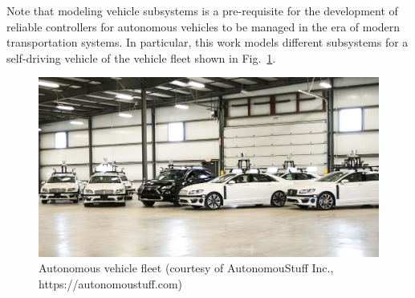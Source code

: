 \documentclass[conference]{IEEEtran}
\begin{document}
Note that modeling vehicle subsystems is a pre-requisite for the development of reliable controllers for autonomous vehicles to be managed in the era of modern transportation systems. In particular, this work models different subsystems for a self-driving vehicle of the vehicle fleet shown in Fig.~\ref{fig:fleet}. %
%
\begin{figure}[htbp]
  \centering
  \includegraphics[scale=0.15]{figs/img/autonomousVehiclesAStuff}
  \caption{Autonomous vehicle fleet (courtesy of AutonomouStuff Inc., https://autonomoustuff.com)}
  \label{fig:fleet}
\end{figure}
%
%
%
\end{document}
